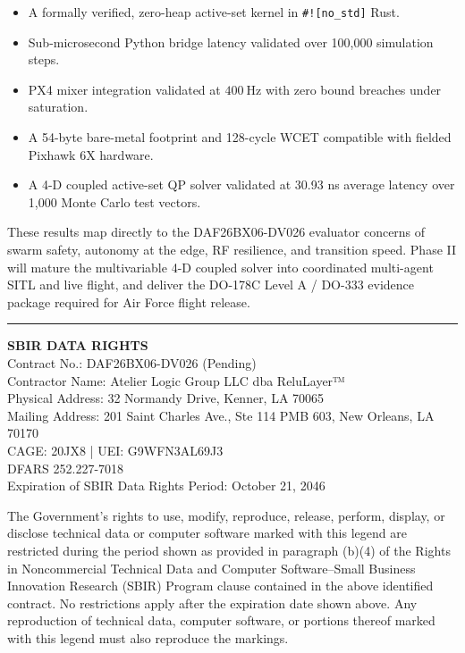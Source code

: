 \documentclass[11pt]{article}
\begin{document}
\begin{itemize}[leftmargin=*]
    \item A formally verified, zero-heap active-set kernel in \texttt{\#![no\_std]} Rust.
    \item Sub-microsecond Python bridge latency validated over 100,000 simulation steps.
    \item PX4 mixer integration validated at $400\ \text{Hz}$ with zero bound breaches under saturation.
    \item A 54-byte bare-metal footprint and 128-cycle WCET compatible with fielded Pixhawk 6X hardware.
    \item A 4-D coupled active-set QP solver validated at 30.93 ns average latency over 1,000 Monte Carlo test vectors.
\end{itemize}

These results map directly to the DAF26BX06-DV026 evaluator concerns of swarm safety, autonomy at the edge, RF resilience, and transition speed. Phase II will mature the multivariable 4-D coupled solver into coordinated multi-agent SITL and live flight, and deliver the DO-178C Level A / DO-333 evidence package required for Air Force flight release.

\vfill
\noindent\rule{\textwidth}{0.4pt}
\noindent\small\textbf{SBIR DATA RIGHTS}\\
Contract No.: DAF26BX06-DV026 (Pending)\\
Contractor Name: Atelier Logic Group LLC dba ReluLayer™\\
Physical Address: 32 Normandy Drive, Kenner, LA 70065\\
Mailing Address: 201 Saint Charles Ave., Ste 114 PMB 603, New Orleans, LA 70170\\
CAGE: 20JX8 | UEI: G9WFN3AL69J3\\
DFARS 252.227-7018\\
Expiration of SBIR Data Rights Period: October 21, 2046

\vspace{0.5em}
\noindent\small
The Government's rights to use, modify, reproduce, release, perform, display, or disclose technical data or computer software marked with this legend are restricted during the period shown as provided in paragraph (b)(4) of the Rights in Noncommercial Technical Data and Computer Software--Small Business Innovation Research (SBIR) Program clause contained in the above identified contract. No restrictions apply after the expiration date shown above. Any reproduction of technical data, computer software, or portions thereof marked with this legend must also reproduce the markings.
\end{document}
